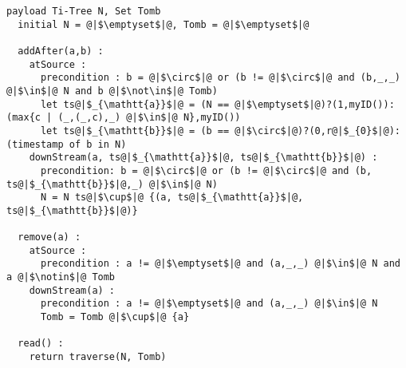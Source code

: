 \begin{lstlisting}[caption={Pseudo-code of the Replicated Growable Array (RGA) CRDT}, captionpos=b,label={lst:rga}]
  payload Ti-Tree N, Set Tomb
  initial N = @|$\emptyset$|@, Tomb = @|$\emptyset$|@

  addAfter(a,b) :
    atSource :
      precondition : b = @|$\circ$|@ or (b != @|$\circ$|@ and (b,_,_) @|$\in$|@ N and b @|$\not\in$|@ Tomb)
      let ts@|$_{\mathtt{a}}$|@ = (N == @|$\emptyset$|@)?(1,myID()):(max{c | (_,(_,c),_) @|$\in$|@ N},myID())
      let ts@|$_{\mathtt{b}}$|@ = (b == @|$\circ$|@)?(0,r@|$_{0}$|@):(timestamp of b in N)
    downStream(a, ts@|$_{\mathtt{a}}$|@, ts@|$_{\mathtt{b}}$|@) :
      precondition: b = @|$\circ$|@ or (b != @|$\circ$|@ and (b, ts@|$_{\mathtt{b}}$|@,_) @|$\in$|@ N)
      N = N ts@|$\cup$|@ {(a, ts@|$_{\mathtt{a}}$|@, ts@|$_{\mathtt{b}}$|@)}

  remove(a) :
    atSource :
      precondition : a != @|$\emptyset$|@ and (a,_,_) @|$\in$|@ N and a @|$\notin$|@ Tomb
    downStream(a) :
      precondition : a != @|$\emptyset$|@ and (a,_,_) @|$\in$|@ N
      Tomb = Tomb @|$\cup$|@ {a}

  read() :
    return traverse(N, Tomb)
\end{lstlisting}


\renewcommand{\algorithmcfname}{CRDT Implementation}
\noindent
\noindent%




